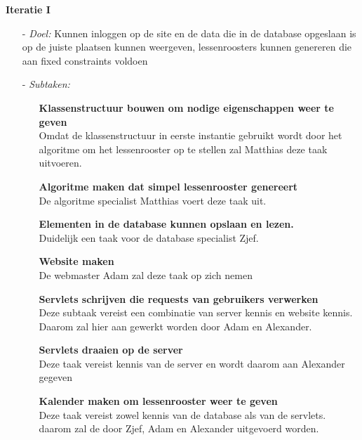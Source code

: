 \documentclass{article}
\begin{document}
\textbf{\large Iteratie I}
\begin{itemize}
\item[-] \textit{Doel:} Kunnen inloggen op de site en de data die in de database opgeslaan is op de juiste plaatsen kunnen weergeven, lessenroosters kunnen genereren die aan fixed constraints voldoen\\[-5mm]
\item[-] \textit{Subtaken:} \\[-5mm]
\begin{itemize}
	\item[] \textbf{Klassenstructuur bouwen om nodige eigenschappen weer te geven} \\
	Omdat de klassenstructuur in eerste instantie gebruikt wordt door het algoritme om het lessenrooster op te stellen zal Matthias deze taak uitvoeren. \\[-5mm]
	\item[] \textbf{Algoritme maken dat simpel lessenrooster genereert} \\
	De algoritme specialist Matthias voert deze taak uit. \\[-5mm]
	\item[] \textbf{Elementen in de database kunnen opslaan en lezen.} \\
	Duidelijk een taak voor de database specialist Zjef. \\[-5mm]
	\item[] \textbf{Website maken} \\
	De webmaster Adam zal deze taak op zich nemen \\[-5mm]
	\item[] \textbf{Servlets schrijven die requests van gebruikers verwerken} \\
	Deze subtaak vereist een combinatie van server kennis en website kennis. Daarom zal hier aan gewerkt worden door Adam en Alexander. \\[-5mm]
	\item[] \textbf{Servlets draaien op de server} \\
	Deze taak vereist kennis van de server en wordt daarom aan Alexander gegeven \\[-5mm]
	\item[] \textbf{Kalender maken om lessenrooster weer te geven} \\
	Deze taak vereist zowel kennis van de database als van de servlets. daarom zal de door Zjef, Adam en Alexander uitgevoerd worden. \\[-5mm]
\end{itemize}
\end{itemize}
\end{document}
